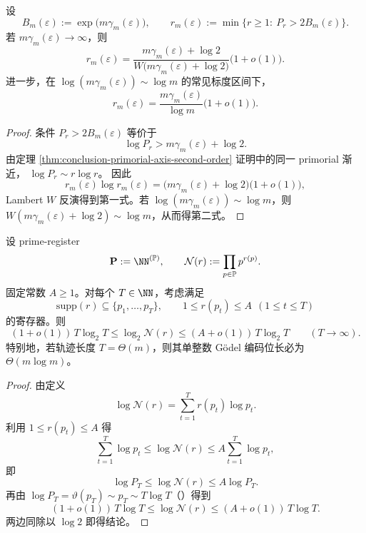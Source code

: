 \begin{corollary}\label{cor:conclusion-prime-budget-axis-lambert}
设
\[
B_m(\varepsilon):=\exp\!\bigl(m\gamma_m(\varepsilon)\bigr),\qquad
r_m(\varepsilon):=\min\{r\ge 1:\ P_r>2B_m(\varepsilon)\}.
\]
若 \(m\gamma_m(\varepsilon)\to\infty\)，则
\[
r_m(\varepsilon)
=
\frac{m\gamma_m(\varepsilon)+\log 2}
{W\!\bigl(m\gamma_m(\varepsilon)+\log 2\bigr)}
\bigl(1+o(1)\bigr).
\]
进一步，在 \(\log(m\gamma_m(\varepsilon))\sim\log m\) 的常见标度区间下，
\[
r_m(\varepsilon)
=
\frac{m\gamma_m(\varepsilon)}{\log m}\bigl(1+o(1)\bigr).
\]
\end{corollary}
\begin{proof}
条件 \(P_r>2B_m(\varepsilon)\) 等价于
\[
\log P_r>m\gamma_m(\varepsilon)+\log 2.
\]
由定理 \ref{thm:conclusion-primorial-axis-second-order} 证明中的同一 primorial 渐近，
\(
\log P_r\sim r\log r
\)。
因此
\[
r_m(\varepsilon)\log r_m(\varepsilon)
=
\bigl(m\gamma_m(\varepsilon)+\log 2\bigr)\bigl(1+o(1)\bigr),
\]
Lambert \(W\) 反演得到第一式。若 \(\log(m\gamma_m(\varepsilon))\sim\log m\)，则
\(
W(m\gamma_m(\varepsilon)+\log 2)\sim\log m
\)，从而得第二式。
\end{proof}

\begin{theorem}\label{thm:conclusion-godel-logarithmic-dimension-tax}
设 prime-register
\[
\mathbf P:=\NN^{(\mathbb P)},\qquad
\mathcal N(r):=\prod_{p\in\mathbb P}p^{r(p)}.
\]
固定常数 \(A\ge 1\)。对每个 \(T\in\NN\)，考虑满足
\[
\mathrm{supp}(r)\subseteq\{p_1,\dots,p_T\},
\qquad
1\le r(p_t)\le A\ \ (1\le t\le T)
\]
的寄存器。则
\[
(1+o(1))\,T\log_2 T
\le
\log_2\mathcal N(r)
\le
(A+o(1))\,T\log_2 T
\qquad (T\to\infty).
\]
特别地，若轨迹长度 \(T=\Theta(m)\)，则其单整数 Gödel 编码位长必为 \(\Theta(m\log m)\)。
\end{theorem}
\begin{proof}
由定义
\[
\log \mathcal N(r)=\sum_{t=1}^{T}r(p_t)\log p_t.
\]
利用 \(1\le r(p_t)\le A\) 得
\[
\sum_{t=1}^{T}\log p_t
\le
\log \mathcal N(r)
\le
A\sum_{t=1}^{T}\log p_t,
\]
即
\[
\log P_T\le \log\mathcal N(r)\le A\log P_T.
\]
再由 \(\log P_T=\vartheta(p_T)\sim p_T\sim T\log T\)（\cite{Apostol1976}）得到
\[
(1+o(1))\,T\log T
\le
\log\mathcal N(r)
\le
(A+o(1))\,T\log T.
\]
两边同除以 \(\log 2\) 即得结论。
\end{proof}

